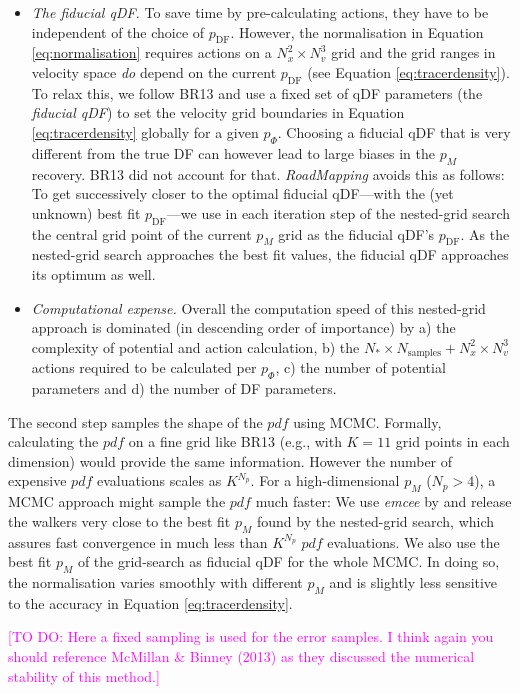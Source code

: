 \documentclass[iop,revtex4]{emulateapj}
\newcommand{\pdf}{\ensuremath{pdf}}
\newcommand{\pmodel}{\ensuremath{p_M}}
\newcommand{\RM}{{\sl RoadMapping}}
\newcommand{\Wilma}[1]{\textcolor{Magenta}{#1}}
\begin{document}
\begin{itemize}
\item \emph{The fiducial qDF.} To save time by pre-calculating actions, they have to be independent of the choice of $p_\text{DF}$. However, the normalisation in Equation \eqref{eq:normalisation} requires actions on a $N_x^2 \times N_v^3$ grid and the grid ranges in velocity space \emph{do} depend on the current $p_\text{DF}$ (see Equation \eqref{eq:tracerdensity}). To relax this, we follow BR13 and use a fixed set of qDF parameters (the \emph{fiducial qDF}) to set the velocity grid boundaries in Equation \eqref{eq:tracerdensity} globally for a given $p_\Phi$. Choosing a fiducial qDF that is very different from the true DF can however lead to large biases in the \pmodel{} recovery. BR13 did not account for that. \RM{} avoids this as follows: To get successively closer to the optimal fiducial qDF---with the (yet unknown) best fit $p_\text{DF}$---we use in each iteration step of the nested-grid search the central grid point of the current \pmodel{} grid as the fiducial qDF's $p_\text{DF}$.  As the nested-grid search approaches the best fit values, the fiducial qDF approaches its optimum as well. 

\item \emph{Computational expense.} Overall the computation speed of this nested-grid approach is dominated (in descending order of importance) by a) the complexity of potential and action calculation, b) the $N_* \times N_\text{samples} + N_x^2 \times N_v^3$ actions required to be calculated per $p_\Phi$, c) the number of potential parameters and d) the number of DF parameters.
\end{itemize}

The second step samples the shape of the \pdf{} using MCMC. Formally, calculating the \pdf{} on a fine grid like BR13 (e.g., with $K=11$ grid points in each dimension) would provide the same information. However the number of expensive \pdf{} evaluations scales as $K^{N_p}$. For a high-dimensional \pmodel{} ($N_p>4$), a MCMC approach might sample the \pdf{} much faster: We use \emph{emcee} by \citet{2013PASP..125..306F} and release the walkers very close to the best fit \pmodel{} found by the nested-grid search, which assures fast convergence in much less than $K^{N_p}$ \pdf{} evaluations. We also use the best fit \pmodel{} of the grid-search as fiducial qDF for the whole MCMC. In doing so, the normalisation varies smoothly with different $\pmodel{}$ and is slightly less sensitive to the accuracy in Equation \eqref{eq:tracerdensity}.

\Wilma{[TO DO: Here a fixed sampling is used for the error samples. I think again you should reference McMillan \& Binney (2013) as they discussed the numerical stability of this method.]}
\end{document}

